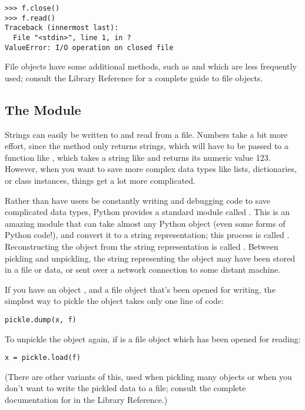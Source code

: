 \documentclass{manual}
\begin{document}
\begin{verbatim}
>>> f.close()
>>> f.read()
Traceback (innermost last):
  File "<stdin>", line 1, in ?
ValueError: I/O operation on closed file
\end{verbatim}

File objects have some additional methods, such as
 and  which are less frequently
used; consult the Library Reference for a complete guide to file
objects.

\subsection{The  Module \label{pickle}}

Strings can easily be written to and read from a file. Numbers take a
bit more effort, since the  method only returns
strings, which will have to be passed to a function like
, which takes a string like  and
returns its numeric value 123.  However, when you want to save more
complex data types like lists, dictionaries, or class instances,
things get a lot more complicated.

Rather than have users be constantly writing and debugging code to
save complicated data types, Python provides a standard module called
.  This is an amazing module that can take almost
any Python object (even some forms of Python code!), and convert it to
a string representation; this process is called .  
Reconstructing the object from the string representation is called
.  Between pickling and unpickling, the string
representing the object may have been stored in a file or data, or
sent over a network connection to some distant machine.

If you have an object , and a file object  that's been
opened for writing, the simplest way to pickle the object takes only
one line of code:

\begin{verbatim}
pickle.dump(x, f)
\end{verbatim}

To unpickle the object again, if  is a file object which has
been opened for reading:

\begin{verbatim}
x = pickle.load(f)
\end{verbatim}

(There are other variants of this, used when pickling many objects or
when you don't want to write the pickled data to a file; consult the
complete documentation for  in the Library Reference.)
\end{document}
